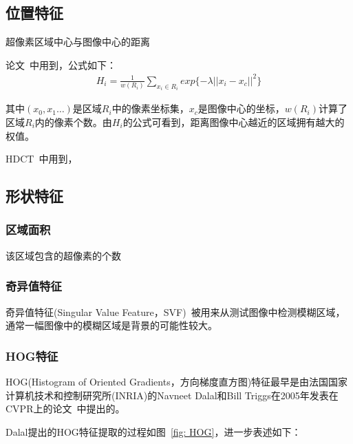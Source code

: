 \documentclass[12pt]{article}
\begin{document}
\subsection{位置特征}

超像素区域中心与图像中心的距离

论文~\cite{yan2013hierarchical}中用到，公式如下：
\begin{align}
H_i = \frac{1}{w(R_i)}\sum_{x_i \in R_i} exp\{-\lambda||x_i-x_c||^2\}
\end{align}

其中$(x_0, x_1 \ldots)$是区域$R_i$中的像素坐标集，$x_c$是图像中心的坐标，$w(R_i)$计算了区域$R_i$内的像素个数。由$H_i$的公式可看到，距离图像中心越近的区域拥有越大的权值。

HDCT~\cite{kim2014salient}中用到，

\subsection{形状特征}

\subsubsection{区域面积}

该区域包含的超像素的个数

\subsubsection{奇异值特征}

奇异值特征(Singular Value Feature，SVF)~\cite{su2011blurred}被用来从测试图像中检测模糊区域，通常一幅图像中的模糊区域是背景的可能性较大。

\subsubsection{HOG特征}

HOG(Histogram of Oriented Gradients，方向梯度直方图)特征最早是由法国国家计算机技术和控制研究所(INRIA)的Navneet Dalal和Bill Triggs在2005年发表在CVPR上的论文~\cite{dalal2005histograms}中提出的。

Dalal提出的HOG特征提取的过程如图~\ref{fig: HOG}，进一步表述如下：
\end{document}
